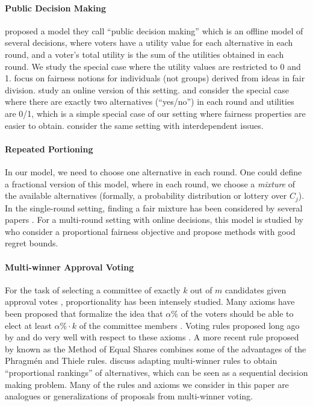\documentclass[10pt]{scrartcl}
\theoremstyle{plain}
\theoremstyle{definition}
\begin{document}
\paragraph{Public Decision Making}
\citet{fairpublicdecisionmaking} proposed a model they call ``public decision making'' which is an offline model of several decisions, where voters have a utility value for each alternative in each round, and a voter's total utility is the sum of the utilities obtained in each round. We study the special case where the utility values are restricted to 0 and 1. \citet{fairpublicdecisionmaking} focus on fairness notions for individuals (not groups) derived from ideas in fair division. \citet{freeman2017fairdynamic} study an online version of this setting.
\citet{freeman2020proportionality} and \citet{skowron2022proportionalpublicdecisions} consider the special case where there are exactly two alternatives (``yes/no'') in each round and utilities are 0/1, which is a simple special case of our setting where fairness properties are easier to obtain. \citet{propinterdependentissues} consider the same setting with interdependent issues.

\paragraph{Repeated Portioning}
In our model, we need to choose one alternative in each round. One could define a fractional version of this model, where in each round, we choose a \emph{mixture} of the available alternatives (formally, a probability distribution or lottery over $C_j$). In the single-round setting, finding a fair mixture has been considered by several papers \citep{BMS05a,FGM16a,ABM20a,BBPS21a}. For a multi-round setting with online decisions, this model is studied by \citet[Section 5]{banerjee2023proportionally} who consider a proportional fairness objective and propose methods with good regret bounds. 

\paragraph{Multi-winner Approval Voting} 
For the task of selecting a committee of exactly $k$ out of $m$ candidates given approval votes \citep{lacknerskowron}, proportionality has been intensely studied. Many axioms have been proposed that formalize the idea that $\alpha\%$ of the voters should be able to elect at least $\alpha\% \cdot k$ of the committee members \citep{ejr,pjr,PeSk20,ejr+}. Voting rules proposed long ago by \citet{Thie95a} and \citet{Phra94a} do very well with respect to these axioms \citep{Jans16a,brill2023phragmen}. A more recent rule proposed by \citet{PeSk20} known as the Method of Equal Shares combines some of the advantages of the Phragmén and Thiele rules. \citet{skowron2017proportional} discuss adapting multi-winner rules to obtain ``proportional rankings'' of alternatives, which can be seen as a sequential decision making problem. Many of the rules and axioms we consider in this paper are analogues or generalizations of proposals from multi-winner voting. 
\end{document}

